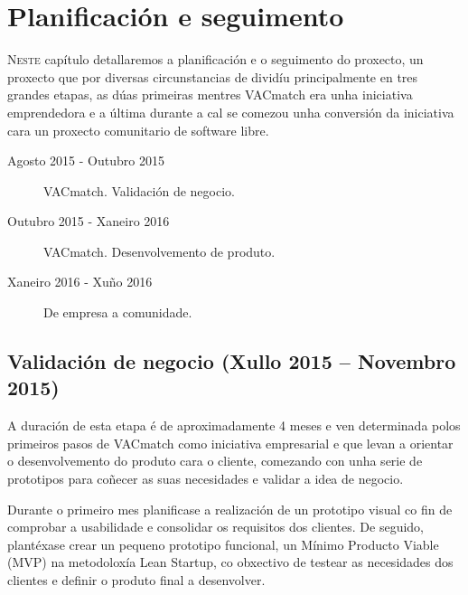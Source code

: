 \chapter{Planificación e seguimento}
\minitoc


  \lettrine{N}{este} capítulo detallaremos a planificación e o seguimento 
do proxecto, un proxecto que por diversas circunstancias de dividíu 
principalmente en tres grandes etapas, as dúas primeiras mentres VACmatch era 
unha iniciativa emprendedora e a última durante a cal se comezou unha conversión 
da iniciativa cara un proxecto comunitario de software libre.


  \begin{description}
    \item [Agosto 2015 - Outubro 2015] VACmatch. Validación de negocio.
    \item [Outubro 2015 - Xaneiro 2016] VACmatch. Desenvolvemento de produto.
    \item [Xaneiro 2016 - Xuño 2016] De empresa a comunidade.
  \end{description}


  \section{Validación de negocio (Xullo 2015 -- Novembro 2015)}
  A duración de esta etapa é de aproximadamente 4 meses e ven determinada polos 
primeiros pasos de VACmatch como iniciativa empresarial e que levan a orientar 
o desenvolvemento do produto cara o cliente, comezando con unha serie de 
prototipos para coñecer as suas necesidades e validar a idea de 
negocio.

  Durante o primeiro mes planificase a realización de un prototipo visual co 
fin de comprobar a usabilidade e consolidar os requisitos dos clientes.
  De seguido, plantéxase crear un pequeno prototipo funcional, un Mínimo 
Producto Viable (MVP) na metodoloxía Lean Startup, co obxectivo de testear as 
necesidades dos clientes e definir o produto final a desenvolver.

